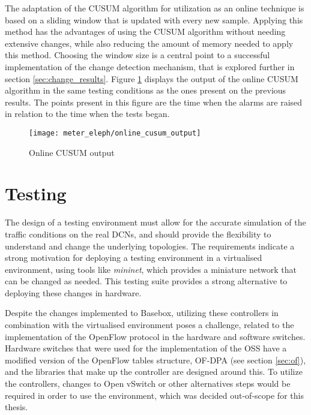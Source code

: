 \par The adaptation of the CUSUM algorithm for utilization as an online technique is based on a sliding window that is updated with every new sample. Applying this
method has the advantages of using the CUSUM algorithm without needing extensive changes, while also reducing the amount of memory needed to apply this method. 
Choosing the window size is a central point to a successful implementation of the change detection mechanism, that is explored further in section 
\ref{sec:change_results}. Figure \ref{fig:online_cusum} displays the output of the online CUSUM algorithm in the same testing conditions as the ones present on
the previous results. The points present in this figure are the time when the alarms are raised in relation to the time when the tests began.

\begin{figure} [H]
    \centering
    \texttt{[image: meter\_eleph/online\_cusum\_output]}
    \caption {Online CUSUM output}
    \label{fig:online_cusum}
\end{figure} 
\section {Testing}

The design of a testing environment must allow for the accurate simulation of the traffic conditions on the real DCNs, and should provide the flexibility to 
understand and change the underlying topologies. The requirements indicate a strong motivation for deploying a testing environment in a virtualised
environment, using tools like \textit{mininet}, which provides a miniature network that can be changed as needed. This testing suite provides a strong 
alternative to deploying these changes in hardware.

\par Despite the changes implemented to Basebox, utilizing these controllers in combination with the virtualised environment poses a challenge, related 
to the implementation of the OpenFlow protocol in the hardware and software switches. Hardware switches that were used for the implementation of
the OSS have a modified version of the OpenFlow tables structure, OF-DPA (see section \ref{sec:of}), and the libraries that make up the 
controller are designed around this. To utilize the controllers, changes to Open vSwitch or other alternatives steps would be required in order to use the
environment, which was decided out-of-scope for this thesis.

